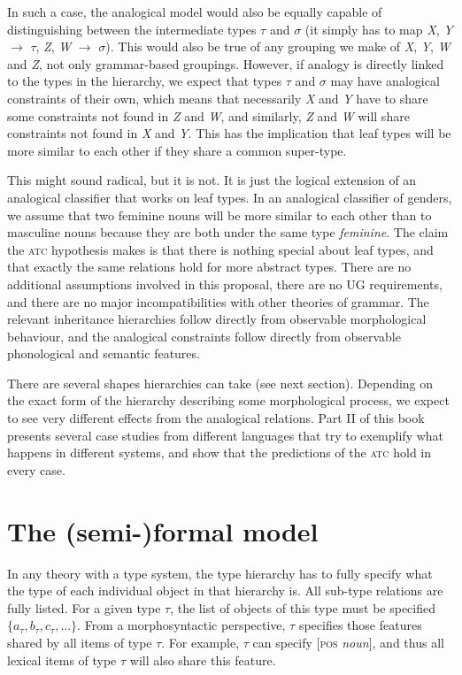 In such a case, the analogical model would also be equally capable of distinguishing between the intermediate types $\tau$ and $\sigma$ (it simply has to map \textit{X}, \textit{Y} $\rightarrow$ $\tau$, \textit{Z}, \textit{W} $\rightarrow$ $\sigma$). This would also be true of any grouping we make of \textit{X}, \textit{Y}, \textit{W} and \textit{Z}, not only grammar-based groupings. However, if analogy is directly linked to the types in the hierarchy, we expect that types $\tau$ and $\sigma$ may have analogical constraints of their own, which means that necessarily \textit{X} and \textit{Y} have to share some constraints not found in \textit{Z} and \textit{W}, and similarly, \textit{Z} and \textit{W} will share constraints not found in \textit{X} and \textit{Y}. This has the implication that leaf types will be more similar to each other if they share a common super-type.

This might sound radical, but it is not. It is just the logical extension of an analogical classifier that works on leaf types. In an analogical classifier of genders, we assume that two feminine nouns will be more similar to each other than to masculine nouns because they are both under the same type \textit{feminine}. The claim the \textsc{atc} hypothesis makes is that there is nothing special about leaf types, and that exactly the same relations hold for more abstract types. There are no additional assumptions involved in this proposal, there are no UG requirements, and there are no major incompatibilities with other theories of grammar. The relevant inheritance hierarchies follow directly from observable morphological behaviour, and the analogical constraints follow directly from observable phonological and semantic features.

There are several shapes hierarchies can take (see next section). Depending on the exact form of the hierarchy describing some morphological process, we expect to see very different effects from the analogical relations. Part II of this book presents several case studies from different languages that try to exemplify what happens in different systems, and show that the predictions of the \textsc{atc} hold in every case.

\section{The (semi-)formal model}

In any theory with a type system, the type hierarchy has to fully specify what the type of each individual object in that hierarchy is. All sub-type relations are fully listed. For a given type $\tau$, the list of objects of this type must be specified $\{a_{\tau}, b_{\tau}, c_{\tau}, \dots \}$. From a morphosyntactic perspective, $\tau$ specifies those features shared by all items of type $\tau$. For example, $\tau$ can specify [\textsc{pos} \textit{noun}], and thus all lexical items of type $\tau$ will also share this feature.

